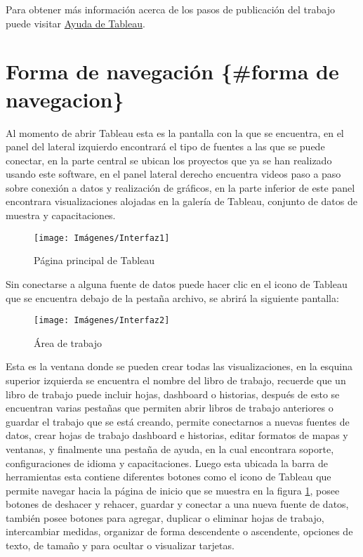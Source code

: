 \documentclass[
]{book}
\begin{document}
Para obtener más información acerca de los pasos de publicación del trabajo puede visitar \href{https://help.tableau.com/current/pro/desktop/en-us/save_savework.htm}{Ayuda de Tableau}.

\hypertarget{forma-de-navegaciuxf3n-forma-de-navegacion}{%
\section{Forma de navegación \{\#forma de navegacion\}}\label{forma-de-navegaciuxf3n-forma-de-navegacion}}

Al momento de abrir Tableau esta es la pantalla con la que se encuentra, en el panel del lateral izquierdo encontrará el tipo de fuentes a las que se puede conectar, en la parte central se ubican los proyectos que ya se han realizado usando este software, en el panel lateral derecho encuentra videos paso a paso sobre conexión a datos y realización de gráficos, en la parte inferior de este panel encontrara visualizaciones alojadas en la galería de Tableau, conjunto de datos de muestra y capacitaciones.

\begin{figure}

{\centering \texttt{[image: Imágenes/Interfaz1]} 

}

\caption{Página principal de Tableau}\label{fig:paginaprincipal-fig}
\end{figure}

Sin conectarse a alguna fuente de datos puede hacer clic en el icono de Tableau que se encuentra debajo de la pestaña archivo, se abrirá la siguiente pantalla:

\begin{figure}

{\centering \texttt{[image: Imágenes/Interfaz2]} 

}

\caption{Área de trabajo}\label{fig:ventanacreacion-fig}
\end{figure}

Esta es la ventana donde se pueden crear todas las visualizaciones, en la esquina superior izquierda se encuentra el nombre del libro de trabajo, recuerde que un libro de trabajo puede incluir hojas, dashboard o historias, después de esto se encuentran varias pestañas que permiten abrir libros de trabajo anteriores o guardar el trabajo que se está creando, permite conectarnos a nuevas fuentes de datos, crear hojas de trabajo dashboard e historias, editar formatos de mapas y ventanas, y finalmente una pestaña de ayuda, en la cual encontrara soporte, configuraciones de idioma y capacitaciones.
Luego esta ubicada la barra de herramientas esta contiene diferentes botones como el icono de Tableau que permite navegar hacia la página de inicio que se muestra en la figura \ref{fig:paginaprincipal-fig}, posee botones de deshacer y rehacer, guardar y conectar a una nueva fuente de datos, también posee botones para agregar, duplicar o eliminar hojas de trabajo, intercambiar medidas, organizar de forma descendente o ascendente, opciones de texto, de tamaño y para ocultar o visualizar tarjetas.
\end{document}
